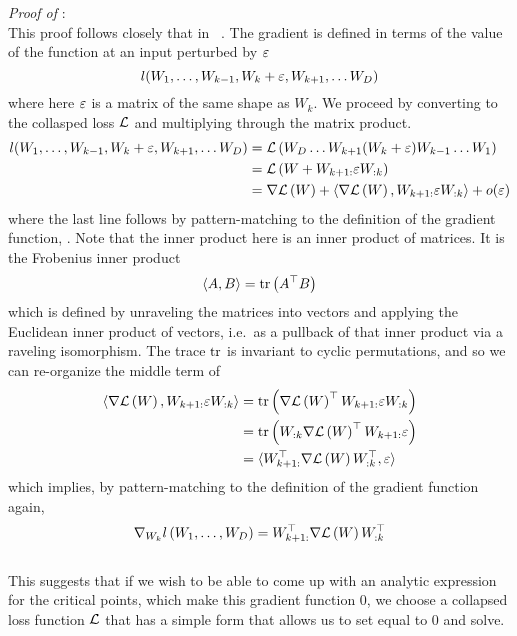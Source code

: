 \documentclass[../../thesis.tex]{subfiles}
\begin{document}
\noindent \emph{Proof of }:\\
This proof follows closely that in%
~\cite{laurent2018}.
The gradient is defined in terms of the value
of the function at an input perturbed by $\varepsilon$
\begin{equation}
	l(W_1, \dots, W_{k-1}, W_k + \varepsilon, W_{k+1}, \dots W_D)
\end{equation}
\noindent where here $\varepsilon$ is a matrix of the same shape as $W_k$.
We proceed by converting to the collasped loss ${\mathcal{L}}$
and multiplying through the matrix product.
\begin{align}
	l(W_1, \dots, W_{k-1}, W_k + \eps, W_{k+1}, \dots W_D)
	&= \cL\left(W_D \dots W_{k+1} (W_k + \eps) W_{k-1} \dots W_1\right)\\
	&= \cL\left(W + W_{k+1:} \eps W_{:k}\right)\\
	&= \grad{\cL}{W} + \langle \grad{\cL}{W}, W_{k+1:} \eps W_{:k}\rangle + o(\eps)
	\equationlabel{taylor-collapsed-loss}
\end{align}
\noindent where the last line follows by pattern-matching
to the definition of the gradient function,
.
Note that the inner product here is an inner product of matrices.
It is the Frobenius inner product
\begin{equation}
	\langle A, B \rangle = \mathrm{tr}\left(A^\top B\right)
\end{equation}
\noindent which is defined by unraveling the matrices into vectors
and applying the Euclidean inner product of vectors,
i.e.~as a pullback of that inner product via a raveling isomorphism.
The trace $\mathrm{tr}$ is invariant to cyclic permutations,
and so we can re-organize the middle term of
\begin{align}
	\langle \nabla{\mathcal{L}}\left(W\right), W_{k+1:} \varepsilon W_{:k}\rangle
	&= \mathrm{tr}\left(\nabla{\mathcal{L}}\left(W\right)^\top W_{k+1:} \varepsilon W_{:k} \right)\\
	&= \mathrm{tr}\left(W_{:k} \nabla{\mathcal{L}}\left(W\right)^\top W_{k+1:} \varepsilon \right)\\
	&= \langle W_{k+1:}^\top \nabla{\mathcal{L}}\left(W\right)W_{:k}^\top, \varepsilon\rangle
\end{align}
\noindent which implies, by pattern-matching
to the definition of the gradient function again,
\begin{equation}
	\nabla_{W_k} l\left(W_1, \dots, W_D\right)
	= W_{k+1:}^\top \nabla{\mathcal{L}}\left(W\right) W_{:k}^\top
\end{equation}
\QED\\

This suggests that if we wish to be able to
come up with an analytic expression for the critical points,
which make this gradient function $0$,
we choose a collapsed loss function ${\mathcal{L}}$
that has a simple form that allows us to set
 equal to $0$ and solve.
\end{document}
